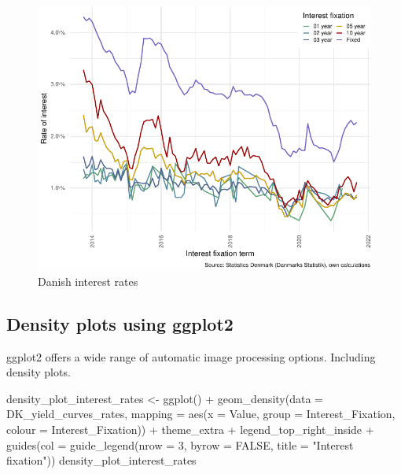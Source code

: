 \documentclass[
]{book}
\newenvironment{Shaded}{\begin{snugshade}}{\end{snugshade}}
\newcommand{\AttributeTok}[1]{\textcolor[rgb]{0.77,0.63,0.00}{#1}}
\newcommand{\ConstantTok}[1]{\textcolor[rgb]{0.00,0.00,0.00}{#1}}
\newcommand{\DecValTok}[1]{\textcolor[rgb]{0.00,0.00,0.81}{#1}}
\newcommand{\FunctionTok}[1]{\textcolor[rgb]{0.00,0.00,0.00}{#1}}
\newcommand{\NormalTok}[1]{#1}
\newcommand{\OtherTok}[1]{\textcolor[rgb]{0.56,0.35,0.01}{#1}}
\newcommand{\SpecialCharTok}[1]{\textcolor[rgb]{0.00,0.00,0.00}{#1}}
\newcommand{\StringTok}[1]{\textcolor[rgb]{0.31,0.60,0.02}{#1}}
\begin{document}
\begin{figure}
\centering
\includegraphics{figures/dst-interestrates-plot-1.pdf}
\caption{\label{fig:dst-interestrates-plot}Danish interest rates}
\end{figure}

\hypertarget{density-plots-using-ggplot2}{%
\subsection{Density plots using ggplot2}\label{density-plots-using-ggplot2}}

ggplot2 offers a wide range of automatic image processing options. Including density plots.

\begin{Shaded}
\begin{Highlighting}[]
\NormalTok{density\_plot\_interest\_rates }\OtherTok{\textless{}{-}} \FunctionTok{ggplot}\NormalTok{() }\SpecialCharTok{+} 
        \FunctionTok{geom\_density}\NormalTok{(}\AttributeTok{data =}\NormalTok{ DK\_yield\_curves\_rates,}
                     \AttributeTok{mapping =} \FunctionTok{aes}\NormalTok{(}\AttributeTok{x =}\NormalTok{ Value,}
                            \AttributeTok{group =}\NormalTok{ Interest\_Fixation,}
                            \AttributeTok{colour =}\NormalTok{ Interest\_Fixation)) }\SpecialCharTok{+}
\NormalTok{    theme\_extra }\SpecialCharTok{+}
\NormalTok{    legend\_top\_right\_inside }\SpecialCharTok{+}
    \FunctionTok{guides}\NormalTok{(}\AttributeTok{col =} \FunctionTok{guide\_legend}\NormalTok{(}\AttributeTok{nrow =} \DecValTok{3}\NormalTok{, }
                              \AttributeTok{byrow =} \ConstantTok{FALSE}\NormalTok{,}
                              \AttributeTok{title =} \StringTok{"Interest fixation"}\NormalTok{))}
\NormalTok{density\_plot\_interest\_rates}
\end{Highlighting}
\end{Shaded}
\end{document}
